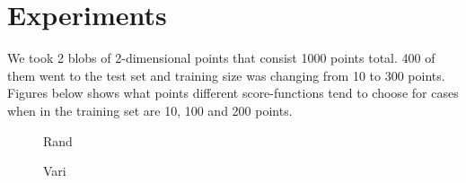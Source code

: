 \documentclass[a4paper]{article}
\begin{document}
\section{Experiments}

We took 2 blobs of 2-dimensional points that consist 1000 points total. 400 of them went to the test set and training size was changing from 10 to 300 points. Figures below shows what points different score-functions tend to choose for cases when in the training set are 10, 100 and 200 points.

\begin{figure}[h]
\begin{minipage}[h]{0.49\linewidth}
 Rand
\end{minipage}
\hfill
\begin{minipage}[h]{0.49\linewidth}
 Vari
\end{minipage}
\vfill
\begin{minipage}[h]{0.49\linewidth}

\end{minipage}
\end{figure}
\end{document}

